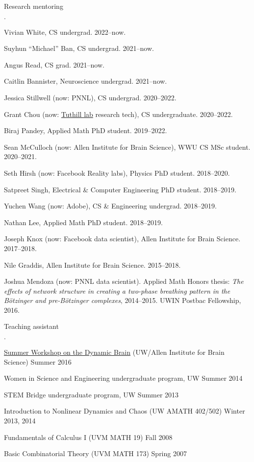 \documentclass[margin,line]{res}
\newenvironment{list1}{
  \begin{list}{$\cdot$}{%
      \setlength{\itemsep}{0in}
      \setlength{\parsep}{0in} \setlength{\parskip}{0in}
      \setlength{\topsep}{0in} \setlength{\partopsep}{0in} 
      \setlength{\leftmargin}{0.17in}}}{\end{list}}
\begin{document}
\begin{resume}
  Research mentoring
  \begin{list1}
  \item Vivian White, CS undergrad. 2022--now.
  \item Suyhun ``Michael'' Ban, CS undergrad. 2021--now.
  \item Angus Read, CS grad. 2021--now.
  \item Caitlin Bannister, Neuroscience undergrad. 2021--now.
  \item Jessica Stillwell (now: PNNL), CS undergrad. 2020--2022.
  \item Grant Chou
    (now: \href{https://faculty.washington.edu/tuthill/people.html}{Tuthill lab} research tech),
    CS undergraduate. 2020--2022.
  \item Biraj Pandey, Applied Math PhD student. 2019--2022.
  \item Sean McCulloch (now: Allen Institute for Brain Science), 
    WWU CS MSc student. 2020--2021.
  \item Seth Hirsh (now: Facebook Reality labs),
    Physics PhD student. 2018--2020.
  \item Satpreet Singh, Electrical \& Computer Engineering PhD student. 2018--2019.
  \item Yuchen Wang (now: Adobe), CS \& Engineering undergrad. 2018--2019.
  \item Nathan Lee, Applied Math PhD student. 2018--2019.
  \item Joseph Knox (now: Facebook data scientist),
    Allen Institute for Brain Science. 2017--2018.
  \item Nile Graddis, Allen Institute for Brain Science. 2015--2018.
  \item Joshua Mendoza (now: PNNL data scientist).
    Applied Math Honors thesis:
    {\it The effects of network structure in creating a two-phase 
      breathing pattern in the B\"otzinger and pre-B\"otzinger complexes},
    2014--2015.
    UWIN Postbac Fellowship, 2016.
  \end{list1}

  Teaching assistant
  \begin{list1}
  \item \href{https://www.youtube.com/watch?v=OmYkj1FImpI}{Summer Workshop on the Dynamic Brain}
    (UW/Allen Institute for Brain Science)
    \hfill Summer 2016
  \item Women in Science and Engineering undergraduate program, UW
    \hfill Summer 2014
  \item STEM Bridge undergraduate program, UW
    \hfill Summer 2013
  \item Introduction to Nonlinear Dynamics and Chaos (UW AMATH 402/502)
    \hfill Winter 2013, 2014
  \item Fundamentals of Calculus I (UVM MATH 19) \hfill Fall 2008
  \item Basic Combinatorial Theory (UVM MATH 173) \hfill Spring 2007
  \end{list1}


\end{resume}
\end{document}
